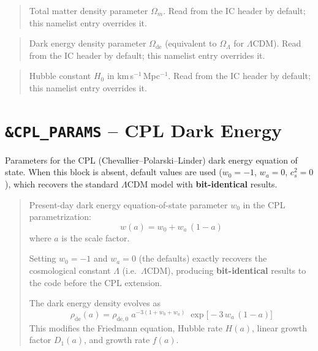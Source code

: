 \begin{quote}
Total matter density parameter $\Omega_m$.  Read from the IC header
by default; this namelist entry overrides it.
\end{quote}

\label{param:cosmo_omega_l}

\begin{quote}
Dark energy density parameter $\Omega_{\mathrm{de}}$ (equivalent to
$\Omega_\Lambda$ for $\Lambda$CDM).  Read from the IC header by
default; this namelist entry overrides it.
\end{quote}

\label{param:cosmo_h0}

\begin{quote}
Hubble constant $H_0$ in km\,s$^{-1}$\,Mpc$^{-1}$.  Read from the
IC header by default; this namelist entry overrides it.
\end{quote}



\section{\texttt{\&CPL\_PARAMS} -- CPL Dark Energy}
\label{sec:cpl_params}

Parameters for the CPL (Chevallier--Polarski--Linder) dark energy
equation of state.  When this block is absent, default values are used
($w_0=-1$, $w_a=0$, $c_s^2=0$), which recovers the standard
$\Lambda$CDM model with \textbf{bit-identical} results.

\label{param:w0}

\begin{quote}
Present-day dark energy equation-of-state parameter $w_0$ in the CPL
parametrization:
\[
  w(a) = w_0 + w_a\,(1 - a)
\]
where $a$ is the scale factor.

Setting $w_0 = -1$ and $w_a = 0$ (the defaults) exactly recovers the
cosmological constant $\Lambda$ (i.e.\ $\Lambda$CDM), producing
\textbf{bit-identical} results to the code before the CPL extension.

The dark energy density evolves as
\[
  \rho_{\mathrm{de}}(a) = \rho_{\mathrm{de},0}\;
  a^{-3(1+w_0+w_a)}\;\exp\!\bigl[-3\,w_a\,(1-a)\bigr]
\]
This modifies the Friedmann equation, Hubble rate $H(a)$, linear
growth factor $D_1(a)$, and growth rate $f(a)$.

\end{quote}

